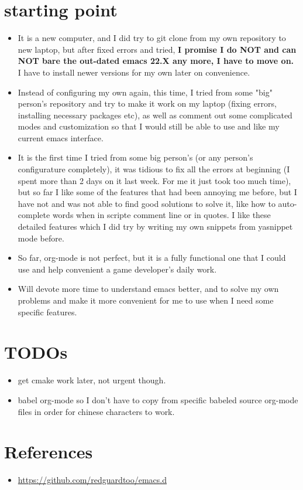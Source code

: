 \documentclass[9pt, b5paper]{article}
\begin{document}
\section{starting point}
\label{sec-2}
\begin{itemize}
\item It is a new computer, and I did try to git clone from my own repository to new laptop, but after fixed errors and tried, \textbf{I promise I do NOT and can NOT bare the out-dated emacs 22.X any more, I have to move on.} I have to install newer versions for my own later on convenience.
\item Instead of configuring my own again, this time, I tried from some "big" person's repository and try to make it work on my laptop (fixing errors, installing necessary packages etc), as well as comment out some complicated modes and customization so that I would still be able to use and like my current emacs interface.
\item It is the first time I tried from some big person's (or any person's configurature completely), it was tidious to fix all the errors at beginning (I spent more than 2 days on it last week. For me it just took too much time), but so far I like some of the features that had been annoying me before, but I have not and was not able to find good solutions to solve it, like how to auto-complete words when in scripte comment line or in quotes. I like these detailed features which I did try by writing my own snippets from yasnippet mode before.
\item So far, org-mode is not perfect, but it is a fully functional one that I could use and help convenient a game developer's daily work.
\item Will devote more time to understand emacs better, and to solve my own problems and make it more convenient for me to use when I need some specific features.
\end{itemize}

\section{TODOs}
\label{sec-3}
\begin{itemize}
\item get cmake work later, not urgent though.
\item babel org-mode so I don't have to copy from specific babeled source org-mode files in order for chinese characters to work.
\end{itemize}

\section{References}
\label{sec-4}
\begin{itemize}
\item \url{https://github.com/redguardtoo/emacs.d}
\end{itemize}
\end{document}

